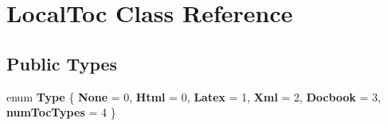 \hypertarget{class_local_toc}{}\section{Local\+Toc Class Reference}
\label{class_local_toc}
\subsection*{Public Types}
\begin{DoxyCompactItemize}
\item 
\mbox{\label{class_local_toc_a665c661f92a4de013f9c54ad52a330ec}} 
enum {\bfseries Type} \{ \newline
{\bfseries None} = 0, 
{\bfseries Html} = 0, 
{\bfseries Latex} = 1, 
{\bfseries Xml} = 2, 
\newline
{\bfseries Docbook} = 3, 
{\bfseries num\+Toc\+Types} = 4
 \}
\end{DoxyCompactItemize}
